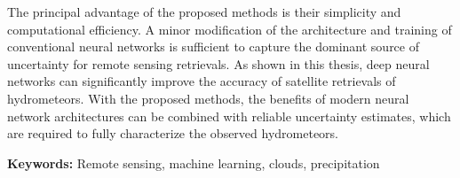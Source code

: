 
The principal advantage of the proposed methods is their simplicity and
computational efficiency. A minor modification of the architecture and training
of conventional neural networks is sufficient to capture the dominant source of
uncertainty for remote sensing retrievals. As shown in this thesis, deep neural
networks can significantly improve the accuracy of satellite retrievals of
hydrometeors. With the proposed methods, the benefits of modern neural network
architectures can be combined with reliable uncertainty estimates, which are
required to fully characterize the observed hydrometeors.

\vfill
{\textbf{Keywords:} Remote sensing, machine learning, clouds, precipitation}



